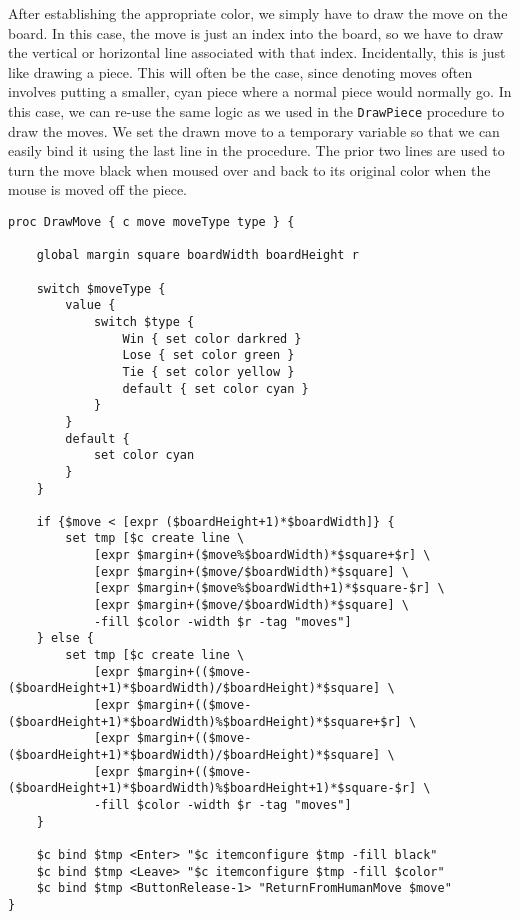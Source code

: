 \documentclass{article}
\begin{document}
After establishing the appropriate color, we simply have to draw the move on the board. In this case, the move is just an index into the board, so we have to draw the vertical or horizontal line associated with that index. Incidentally, this is just like drawing a piece. This will often be the case, since denoting moves often involves putting a smaller, cyan piece where a normal piece would normally go. In this case, we can re-use the same logic as we used in the \texttt{DrawPiece} procedure to draw the moves. We set the drawn move to a temporary variable so that we can easily bind it using the last line in the procedure. The prior two lines are used to turn the move black when moused over and back to its original color when the mouse is moved off the piece.

\begin{verbatim}
proc DrawMove { c move moveType type } {

    global margin square boardWidth boardHeight r

    switch $moveType {
        value {
            switch $type {
                Win { set color darkred }
                Lose { set color green }
                Tie { set color yellow }
                default { set color cyan }
            }
        }
        default {
            set color cyan
        }
    }

    if {$move < [expr ($boardHeight+1)*$boardWidth]} {
        set tmp [$c create line \
            [expr $margin+($move%$boardWidth)*$square+$r] \
            [expr $margin+($move/$boardWidth)*$square] \
            [expr $margin+($move%$boardWidth+1)*$square-$r] \
            [expr $margin+($move/$boardWidth)*$square] \
            -fill $color -width $r -tag "moves"]
    } else {
        set tmp [$c create line \
            [expr $margin+(($move-($boardHeight+1)*$boardWidth)/$boardHeight)*$square] \
            [expr $margin+(($move-($boardHeight+1)*$boardWidth)%$boardHeight)*$square+$r] \
            [expr $margin+(($move-($boardHeight+1)*$boardWidth)/$boardHeight)*$square] \
            [expr $margin+(($move-($boardHeight+1)*$boardWidth)%$boardHeight+1)*$square-$r] \
            -fill $color -width $r -tag "moves"]
    }

    $c bind $tmp <Enter> "$c itemconfigure $tmp -fill black"
    $c bind $tmp <Leave> "$c itemconfigure $tmp -fill $color"
    $c bind $tmp <ButtonRelease-1> "ReturnFromHumanMove $move"
}
\end{verbatim}

\end{document}
